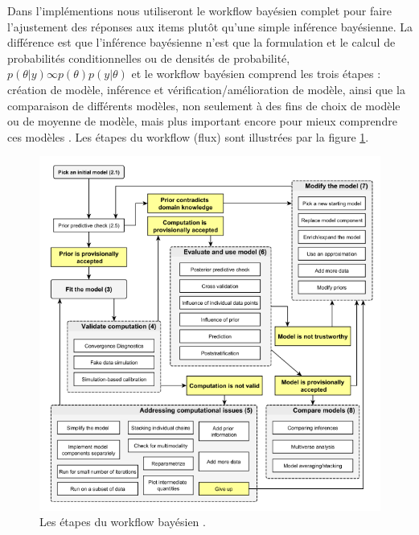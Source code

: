 Dans l’implémentions nous utiliseront le workflow bayésien complet pour faire l’ajustement des réponses aux items plutôt qu’une simple inférence bayésienne. La différence est que l'inférence bayésienne n'est que la formulation et le calcul de probabilités conditionnelles ou de densités de probabilité, \(\displaystyle p(\theta|y) \infty  p(\theta)p(y|\theta) \) et le workflow bayésien comprend les trois étapes : création de modèle, inférence et vérification/amélioration de modèle, ainsi que la comparaison de différents modèles, non seulement à des fins de choix de modèle ou de moyenne de modèle, mais plus important encore pour mieux comprendre ces modèles \cite{gelman2020bayesian}. Les étapes du workflow (flux) sont illustrées par la figure \ref{irt_process}. 
\begin{figure}[H]
	\begin{center}
		\includegraphics[width=\textwidth]{images/chapitre5/irt_process.png}
	\end{center}
	\caption{Les étapes du workflow bayésien \cite{gelman2020bayesian}.}
	\label{irt_process}
\end{figure}

